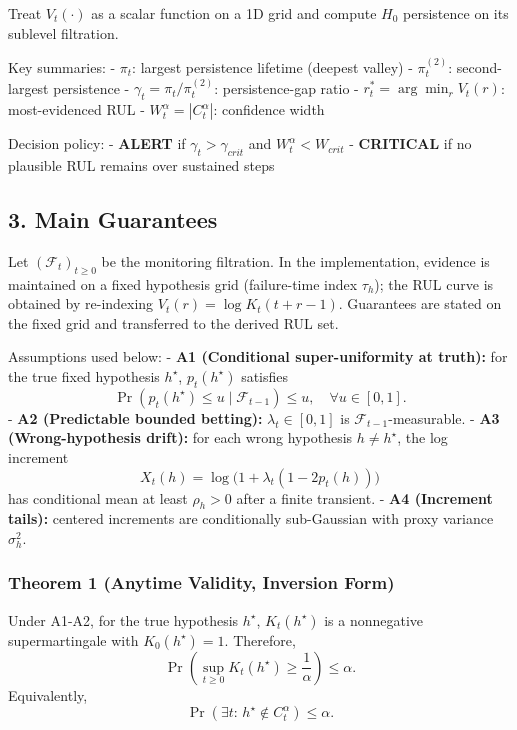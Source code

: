 \documentclass[
]{article}
\begin{document}
Treat \(V_t(\cdot)\) as a scalar function on a 1D grid and compute
\(H_0\) persistence on its sublevel filtration.

Key summaries: - \(\pi_t\): largest persistence lifetime (deepest
valley) - \(\pi_t^{(2)}\): second-largest persistence -
\(\gamma_t=\pi_t/\pi_t^{(2)}\): persistence-gap ratio -
\(r_t^*=\arg\min_r V_t(r)\): most-evidenced RUL -
\(W_t^\alpha=|C_t^\alpha|\): confidence width

Decision policy: - \textbf{ALERT} if \(\gamma_t>\gamma_{crit}\) and
\(W_t^\alpha<W_{crit}\) - \textbf{CRITICAL} if no plausible RUL remains
over sustained steps

\subsection{3. Main Guarantees}\label{main-guarantees}

Let \((\mathcal F_t)_{t\ge 0}\) be the monitoring filtration. In the
implementation, evidence is maintained on a fixed hypothesis grid
(failure-time index \(\tau_h\)); the RUL curve is obtained by
re-indexing \(V_t(r)=\log K_t(t+r-1)\). Guarantees are stated on the
fixed grid and transferred to the derived RUL set.

Assumptions used below: - \textbf{A1 (Conditional super-uniformity at
truth):} for the true fixed hypothesis \(h^\star\), \(p_t(h^\star)\)
satisfies \[
  \Pr\!\left(p_t(h^\star)\le u\mid \mathcal F_{t-1}\right)\le u,\quad \forall u\in[0,1].
  \] - \textbf{A2 (Predictable bounded betting):} \(\lambda_t\in[0,1]\)
is \(\mathcal F_{t-1}\)-measurable. - \textbf{A3 (Wrong-hypothesis
drift):} for each wrong hypothesis \(h\neq h^\star\), the log increment
\[
  X_t(h)=\log\!\big(1+\lambda_t(1-2p_t(h))\big)
  \] has conditional mean at least \(\rho_h>0\) after a finite
transient. - \textbf{A4 (Increment tails):} centered increments are
conditionally sub-Gaussian with proxy variance \(\sigma_h^2\).

\subsubsection{Theorem 1 (Anytime Validity, Inversion
Form)}\label{theorem-1-anytime-validity-inversion-form}

Under A1-A2, for the true hypothesis \(h^\star\), \(K_t(h^\star)\) is a
nonnegative supermartingale with \(K_0(h^\star)=1\). Therefore, \[
\Pr\!\left(\sup_{t\ge 0}K_t(h^\star)\ge \frac1\alpha\right)\le \alpha.
\] Equivalently, \[
\Pr\!\left(\exists t:\, h^\star\notin C_t^\alpha\right)\le \alpha.
\]
\end{document}
